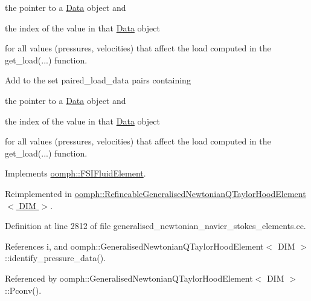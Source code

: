 \begin{DoxyItemize}
\item the pointer to a \hyperlink{classoomph_1_1Data}{Data} object and
\item the index of the value in that \hyperlink{classoomph_1_1Data}{Data} object
\end{DoxyItemize}for all values (pressures, velocities) that affect the load computed in the {\ttfamily get\+\_\+load}(...) function.

Add to the set {\ttfamily paired\+\_\+load\+\_\+data} pairs containing
\begin{DoxyItemize}
\item the pointer to a \hyperlink{classoomph_1_1Data}{Data} object and
\item the index of the value in that \hyperlink{classoomph_1_1Data}{Data} object
\end{DoxyItemize}for all values (pressures, velocities) that affect the load computed in the {\ttfamily get\+\_\+load}(...) function. 

Implements \hyperlink{classoomph_1_1FSIFluidElement_a13c5f835cddd1b78e6d2582733619300}{oomph\+::\+F\+S\+I\+Fluid\+Element}.



Reimplemented in \hyperlink{classoomph_1_1RefineableGeneralisedNewtonianQTaylorHoodElement_a1ac7edfbc1114f039d4ed73ad9234be3}{oomph\+::\+Refineable\+Generalised\+Newtonian\+Q\+Taylor\+Hood\+Element$<$ D\+I\+M $>$}.



Definition at line 2812 of file generalised\+\_\+newtonian\+\_\+navier\+\_\+stokes\+\_\+elements.\+cc.



References i, and oomph\+::\+Generalised\+Newtonian\+Q\+Taylor\+Hood\+Element$<$ D\+I\+M $>$\+::identify\+\_\+pressure\+\_\+data().



Referenced by oomph\+::\+Generalised\+Newtonian\+Q\+Taylor\+Hood\+Element$<$ D\+I\+M $>$\+::\+Pconv().

\mbox{\label{classoomph_1_1GeneralisedNewtonianQTaylorHoodElement_a369b7a71e40d491ea34858e940431492}} 
